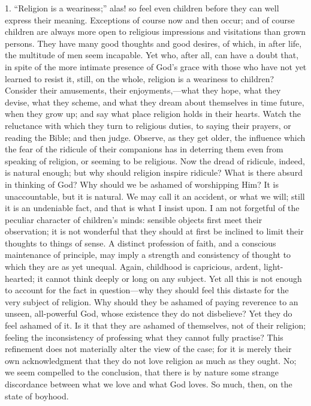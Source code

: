 1. ``Religion is a weariness;'' alas! so feel even children
before they can well express their meaning. Exceptions of course now
and then occur; and of course children are always more open to
religious impressions and visitations than grown persons. They have
many good thoughts and good desires, of which, in after life, the
multitude of men seem incapable. Yet who, after all, can have a doubt
that, in spite of the more intimate presence of God's grace with those
who have not yet learned to resist it, still, on the whole, religion
is a weariness to children? Consider their amusements, their
enjoyments,—what they hope, what they devise, what they scheme, and
what they dream about themselves in time future, when they grow up;
and say what place religion holds in their hearts. Watch the
reluctance with which they turn to religious duties, to saying their
prayers, or reading the Bible; and then judge. Observe, as they get
older, the influence which the fear of the ridicule of their
companions has in deterring them even from speaking of religion, or
seeming to be religious. Now the dread of ridicule, indeed, is natural
enough; but why should religion inspire ridicule? What is there absurd
in thinking of God? Why should we be ashamed of worshipping Him? It is
unaccountable, but it is natural. We may call it an accident, or what
we will; still it is an undeniable fact, and that is what I insist
upon. I am not forgetful of the peculiar character of children's
minds: sensible objects first meet their observation; it is not
wonderful that they should at first be inclined to limit their
thoughts to things of sense. A distinct profession of faith, and a
conscious maintenance of principle, may imply a strength and
consistency of thought to which they are as yet unequal. Again,
childhood is capricious, ardent, light-hearted; it cannot think deeply
or long on any subject. Yet all this is not enough to account for the
fact in question—why they should feel this distaste for the very
subject of religion. Why should they be ashamed of paying reverence to
an unseen, all-powerful God, whose existence they do not disbelieve?
Yet they do feel ashamed of it. Is it that they are ashamed of
themselves, not of their religion; feeling the inconsistency of
professing what they cannot fully practise? This refinement does not
materially alter the view of the case; for it is merely their own
acknowledgment that they do not love religion as much as they ought.
No; we seem compelled to the conclusion, that there is by nature some
strange discordance between what we love and what God loves. So much,
then, on the state of boyhood.

